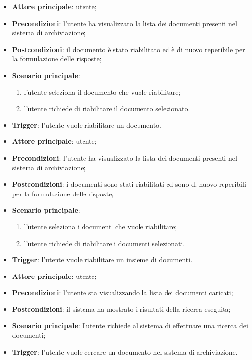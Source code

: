 \documentclass[10pt, a4paper]{article}
\begin{document}
    \begin{itemize}
        \item \textbf{Attore principale}: utente;
        \item \textbf{Precondizioni}: l’utente ha visualizzato la lista dei documenti presenti nel sistema di archiviazione;
        \item \textbf{Postcondizioni}: il documento è stato riabilitato ed è di nuovo reperibile per la formulazione delle risposte;
        \item \textbf{Scenario principale}:
            \begin{enumerate}
                \item l’utente seleziona il documento che vuole riabilitare;
                \item l’utente richiede di riabilitare il documento selezionato.
            \end{enumerate}
        \item \textbf{Trigger}: l’utente vuole riabilitare un documento.
    \end{itemize}

    \begin{itemize}
        \item \textbf{Attore principale}: utente;
        \item \textbf{Precondizioni}: l’utente ha visualizzato la lista dei documenti presenti nel sistema di archiviazione;
        \item \textbf{Postcondizioni}: i documenti sono stati riabilitati ed sono di nuovo reperibili per la formulazione delle risposte;
        \item \textbf{Scenario principale}:
            \begin{enumerate}
                \item l’utente seleziona i documenti che vuole riabilitare;
                \item l’utente richiede di riabilitare i documenti selezionati.
            \end{enumerate}
        \item \textbf{Trigger}: l’utente vuole riabilitare un insieme di documenti.
    \end{itemize}

    \begin{itemize}
        \item \textbf{Attore principale}: utente;
        \item \textbf{Precondizioni}: l’utente sta visualizzando la lista dei documenti caricati;
        \item \textbf{Postcondizioni}: il sistema ha mostrato i risultati della ricerca eseguita;
        \item \textbf{Scenario principale}: l’utente richiede al sistema di effettuare una ricerca dei documenti;
        \item \textbf{Trigger}: l’utente vuole cercare un documento nel sistema di archiviazione.
    \end{itemize}
    
\end{document}
